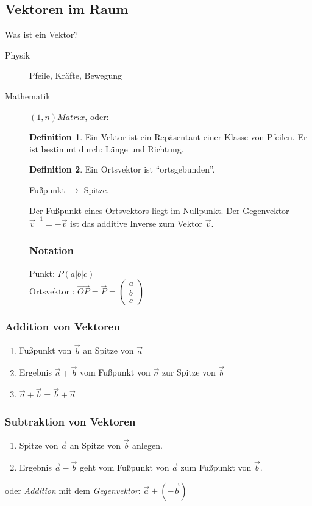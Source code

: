 \documentclass[a4paper,10pt,DIV9, BCOR12mm, oneside,openright,openbib]{scrreprt}
\theoremstyle{definition}
\newtheorem{mydef}{Definition}[section]
\theoremstyle{plain}
\begin{document}
\subsection{Vektoren im Raum}
Was ist ein Vektor?
\begin{description}
 \item[Physik] Pfeile, Kräfte, Bewegung
 \item[Mathematik] $(1,n) Matrix$, oder:
 \begin{mydef}
 Ein Vektor ist ein Repäsentant einer Klasse von Pfeilen. Er ist bestimmt durch: Länge und Richtung.
 \end{mydef}
 \begin{mydef}
 Ein Ortsvektor ist "`ortsgebunden"'. \\
\begin{center}Fußpunkt $\longmapsto$ Spitze. \end{center}
Der Fußpunkt eines Ortsvektors liegt im Nullpunkt. Der Gegenvektor $\overrightarrow{v}^{-1} = - \overrightarrow{v}$ ist das additive Inverse zum Vektor $\overrightarrow{v}$.
 \end{mydef}
 \subsubsection{Notation}
 Punkt: $ P(a|b|c)$ \\
 Ortsvektor : $\overrightarrow{OP} = \overrightarrow{P} = \begin{pmatrix} a \\ b \\ c \end{pmatrix}$
\end{description}

\subsubsection{Addition von Vektoren} 
\begin{enumerate}
 \item Fußpunkt von $\overrightarrow{b}$ an Spitze von $\overrightarrow{a}$
 \item Ergebnis $\overrightarrow{a}+\overrightarrow{b}$ vom Fußpunkt von $\overrightarrow{a}$ zur Spitze von $\overrightarrow{b}$ 
 \item $\overrightarrow{a} + \overrightarrow{b} = \overrightarrow{b} + \overrightarrow{a}$
\end{enumerate}

\subsubsection{Subtraktion von Vektoren} 
\begin{enumerate}
 \item Spitze von $\overrightarrow{a}$ an Spitze von $\overrightarrow{b}$ anlegen.
 \item Ergebnis $\overrightarrow{a}-\overrightarrow{b}$ geht vom Fußpunkt von $\overrightarrow{a}$ zum Fußpunkt von $\overrightarrow{b}$.
\end{enumerate}
oder \textit{Addition} mit dem \textit{Gegenvektor}: $\overrightarrow{a} + (-\overrightarrow{b})$
\end{document}
